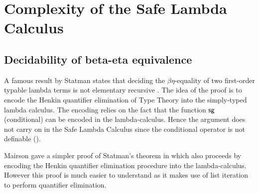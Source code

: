 \section{Complexity of the Safe Lambda Calculus}

\subsection{Decidability of beta-eta equivalence}



A famous result by Statman  states that deciding the $\beta\eta$-equality of two first-order typable lambda terms is not elementary recursive \cite{Statman:1979:TLE}.
The idea of the proof is to encode the Henkin quantifier elimination of Type Theory into the simply-typed lambda calculus. The encoding relies on the fact that the function $\sf sg$ (conditional) can be encoded in the lambda-calculus. Hence the argument does not carry on   in the Safe Lambda Calculus since the conditional operator is not definable (\cite{blumong:safelambdacalculus}).

Mairson gave a simpler proof of Statman's theorem in \cite{mairson1992spt} which also proceeds by encoding the Henkin quantifier elimination procedure into the lambda-calculus. However this proof is much easier to understand as it makes use of list iteration to perform quantifier elimination.

